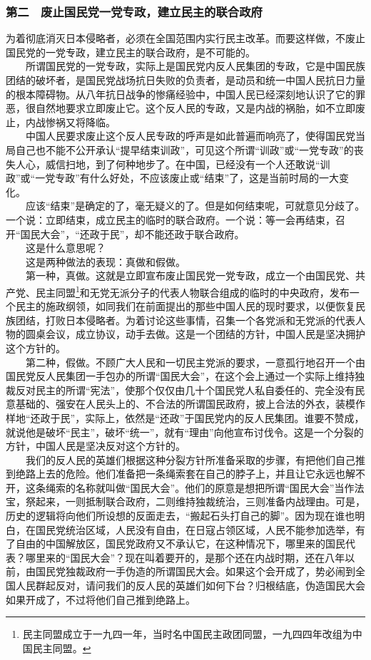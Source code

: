 \documentclass[cn,11pt,chinese]{elegantbook}
\def\myformat#1{\hfil\hfil #1}
\begin{document}
\subsubsection*{\myformat{第二　废止国民党一党专政，建立民主的联合政府}}
为着彻底消灭日本侵略者，必须在全国范围内实行民主改革。而要这样做，不废止国民党的一党专政，建立民主的联合政府，是不可能的。\\
　　所谓国民党的一党专政，实际上是国民党内反人民集团的专政，它是中国民族团结的破坏者，是国民党战场抗日失败的负责者，是动员和统一中国人民抗日力量的根本障碍物。从八年抗日战争的惨痛经验中，中国人民已经深刻地认识了它的罪恶，很自然地要求立即废止它。这个反人民的专政，又是内战的祸胎，如不立即废止，内战惨祸又将降临。\\
　　中国人民要求废止这个反人民专政的呼声是如此普遍而响亮了，使得国民党当局自己也不能不公开承认“提早结束训政”，可见这个所谓“训政”或“一党专政”的丧失人心，威信扫地，到了何种地步了。在中国，已经没有一个人还敢说“训政”或“一党专政”有什么好处，不应该废止或“结束”了，这是当前时局的一大变化。\\
　　应该“结束”是确定的了，毫无疑义的了。但是如何结束呢，可就意见分歧了。一个说：立即结束，成立民主的临时的联合政府。一个说：等一会再结束，召开“国民大会”，“还政于民”，却不能还政于联合政府。\\
　　这是什么意思呢？\\
　　这是两种做法的表现：真做和假做。\\
　　第一种，真做。这就是立即宣布废止国民党一党专政，成立一个由国民党、共产党、民主同盟\footnote[16]{  民主同盟成立于一九四一年，当时名中国民主政团同盟，一九四四年改组为中国民主同盟。}和无党无派分子的代表人物联合组成的临时的中央政府，发布一个民主的施政纲领，如同我们在前面提出的那些中国人民的现时要求，以便恢复民族团结，打败日本侵略者。为着讨论这些事情，召集一个各党派和无党派的代表人物的圆桌会议，成立协议，动手去做。这是一个团结的方针，中国人民是坚决拥护这个方针的。\\
　　第二种，假做。不顾广大人民和一切民主党派的要求，一意孤行地召开一个由国民党反人民集团一手包办的所谓“国民大会”，在这个会上通过一个实际上维持独裁反对民主的所谓“宪法”，使那个仅仅由几十个国民党人私自委任的、完全没有民意基础的、强安在人民头上的、不合法的所谓国民政府，披上合法的外衣，装模作样地“还政于民”，实际上，依然是“还政”于国民党内的反人民集团。谁要不赞成，就说他是破坏“民主”，破坏“统一”，就有“理由”向他宣布讨伐令。这是一个分裂的方针，中国人民是坚决反对这个方针的。\\
　　我们的反人民的英雄们根据这种分裂方针所准备采取的步骤，有把他们自己推到绝路上去的危险。他们准备把一条绳索套在自己的脖子上，并且让它永远也解不开，这条绳索的名称就叫做“国民大会”。他们的原意是想把所谓“国民大会”当作法宝，祭起来，一则抵制联合政府，二则维持独裁统治，三则准备内战理由。可是，历史的逻辑将向他们所设想的反面走去，“搬起石头打自己的脚”。因为现在谁也明白，在国民党统治区域，人民没有自由，在日寇占领区域，人民不能参加选举，有了自由的中国解放区，国民党政府又不承认它，在这种情况下，哪里来的国民代表？哪里来的“国民大会”？现在叫着要开的，是那个还在内战时期，还在八年以前，由国民党独裁政府一手伪造的所谓国民大会。如果这个会开成了，势必闹到全国人民群起反对，请问我们的反人民的英雄们如何下台？归根结底，伪造国民大会如果开成了，不过将他们自己推到绝路上。\\
\end{document}
